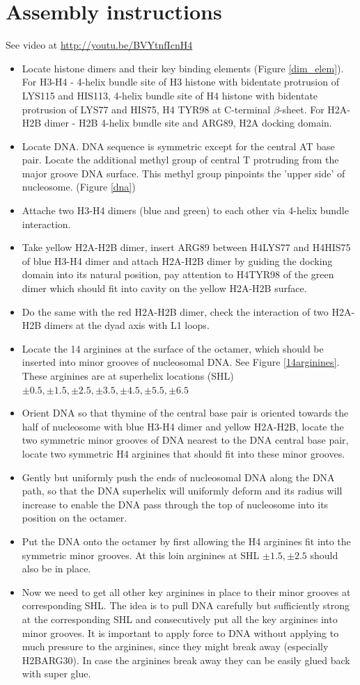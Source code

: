 \documentclass[12pt,onecolumn]{scrartcl}
\begin{document}
\section{Assembly instructions}
See video at \url{http://youtu.be/BVYtnfIcnH4}
\begin{itemize}
\item Locate histone dimers and their key binding elements (Figure \ref{dim_elem}). For H3-H4 - 4-helix bundle site of H3 histone with bidentate protrusion of LYS115 and HIS113, 4-helix bundle site of H4 histone with bidentate protrusion of LYS77 and HIS75, H4 TYR98 at C-terminal $\beta$-sheet. For H2A-H2B dimer - H2B 4-helix bundle site and ARG89, H2A docking domain.
\item Locate DNA. DNA sequence is symmetric except for the central AT base pair. Locate the additional methyl group of central T protruding from the major groove DNA surface. This methyl group pinpoints the 'upper side' of nucleosome. (Figure \ref{dna})
\item Attache two H3-H4 dimers (blue and green) to each other via 4-helix bundle interaction.
\item Take yellow H2A-H2B dimer, insert ARG89 between H4LYS77 and H4HIS75 of blue H3-H4 dimer and attach H2A-H2B dimer by guiding the docking domain into its natural position, pay attention to H4TYR98 of the green dimer which should fit into cavity on the yellow H2A-H2B surface.
\item Do the same with the red H2A-H2B dimer, check the interaction of two H2A-H2B dimers at the dyad axis with L1 loops.
\item Locate the 14 arginines at the surface of the octamer, which should be inserted into minor grooves of nucleosomal DNA. See Figure \ref{14arginines}. These arginines are at superhelix locations (SHL) $\pm0.5,\pm1.5,\pm2.5,\pm3.5,\pm4.5,\pm5.5,\pm6.5$
\item Orient DNA so that thymine of the central base pair is oriented towards the half of nucleosome with blue H3-H4 dimer and yellow H2A-H2B, locate the two symmetric minor grooves of DNA nearest to the DNA central base pair, locate two symmetric H4 arginines that should fit into these minor grooves.
\item Gently but uniformly push the ends of nucleosomal DNA along the DNA path, so that the DNA superhelix will uniformly deform and its radius will increase to enable the DNA pass through the top of nucleosome into its position on the octamer.
\item Put the DNA onto the octamer by first allowing the H4 arginines fit into the symmetric minor grooves. At this loin arginines at SHL $\pm1.5,\pm2.5$ should also be in place.
\item Now we need to get all other key arginines in place to their minor grooves at corresponding SHL. The idea is to pull DNA carefully but sufficiently strong at the corresponding SHL and consecutively put all the key arginines into minor grooves. It is important to apply force to DNA without applying to much pressure to the arginines, since they might break away (especially H2BARG30). In case the arginines break away they can be easily glued back with super glue.
\end{itemize}
\end{document}

